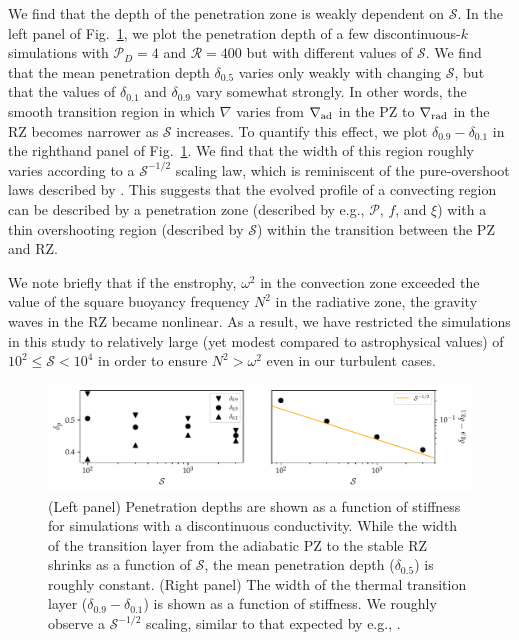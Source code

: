 \documentclass[twocolumn]{aastex631}
\newcommand{\gradrad}{\ensuremath{\nabla_{\rm{rad}}}}
\newcommand{\gradad}{\ensuremath{\nabla_{\rm{ad}}}}
\newcommand{\justgrad}{\ensuremath{\nabla}}
\newcommand{\mP}{\ensuremath{\mathcal{P}}}
\newcommand{\mR}{\ensuremath{\mathcal{R}}}
\newcommand{\mS}{\ensuremath{\mathcal{S}}}
\begin{document}
We find that the depth of the penetration zone is weakly dependent on $\mS$.
In the left panel of Fig.~\ref{fig:parameters_vs_s}, we plot the penetration depth of a few discontinuous-$k$ simulations with $\mP_D = 4$ and $\mR = 400$ but with different values of $\mS$.
We find that the mean penetration depth $\delta_{0.5}$ varies only weakly with changing $\mS$, but that the values of $\delta_{0.1}$ and $\delta_{0.9}$ vary somewhat strongly.
In other words, the smooth transition region in which $\justgrad$ varies from $\gradad$ in the PZ to $\gradrad$ in the RZ becomes narrower as $\mS$ increases.
To quantify this effect, we plot $\delta_{0.9} - \delta_{0.1}$ in the righthand panel of Fig.~\ref{fig:parameters_vs_s}.
We find that the width of this region roughly varies according to a $\mS^{-1/2}$ scaling law, which is reminiscent of the pure-overshoot laws described by \citet{korre_etal_2019}.
This suggests that the evolved profile of a convecting region can be described by a penetration zone (described by e.g., $\mP$, $f$, and $\xi$) with a thin overshooting region (described by $\mS$) within the transition between the PZ and RZ.

We note briefly that if the enstrophy, $\omega^2$ in the convection zone exceeded the value of the square buoyancy frequency $N^2$ in the radiative zone, the gravity waves in the RZ became nonlinear.
As a result, we have restricted the simulations in this study to relatively large (yet modest compared to astrophysical values) of $10^{2} \leq \mS < 10^4$ in order to ensure $N^2 > \omega^2$ even in our turbulent cases.

\begin{figure}[t!]
\centering
\includegraphics{parameters_vs_s.pdf}
\caption{
(Left panel) Penetration depths are shown as a function of stiffness for simulations with a discontinuous conductivity.
While the width of the transition layer from the adiabatic PZ to the stable RZ shrinks as a function of $\mS$, the mean penetration depth ($\delta_{0.5}$) is roughly constant.
(Right panel) The width of the thermal transition layer ($\delta_{0.9} - \delta_{0.1}$) is shown as a function of stiffness.
We roughly observe a $\mS^{-1/2}$ scaling, similar to that expected by e.g., \citet{korre_etal_2019}.
\label{fig:parameters_vs_s}
}
\end{figure}
\end{document}
